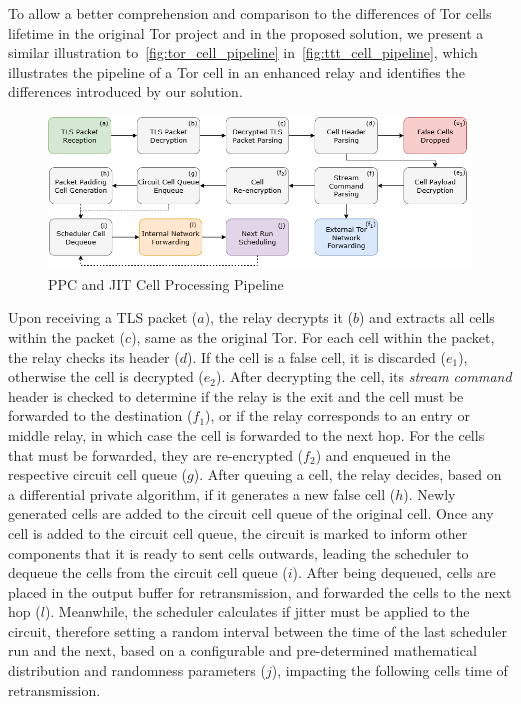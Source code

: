 To allow a better comprehension and comparison to the differences of Tor cells lifetime in the original Tor project and in the proposed solution, we present a similar illustration to~\autoref{fig:tor_cell_pipeline} in~\autoref{fig:ttt_cell_pipeline}, which illustrates the pipeline of a Tor cell in an enhanced relay and identifies the differences introduced by our solution.
\begin{figure}[!h]
  \centering
  \includegraphics[width=\textwidth]{Chapters/Figures/Solution_Cell_Pipeline.png}
  \caption{PPC and JIT Cell Processing Pipeline}\label{fig:ttt_cell_pipeline}
\end{figure}

Upon receiving a TLS packet (\(a\)), the relay decrypts it (\(b\)) and extracts all cells within the packet (\(c\)), same as the original Tor. For each cell within the packet, the relay checks its header (\(d\)). If the cell is a false cell, it is discarded (\(e_1\)), otherwise the cell is decrypted (\(e_2\)). After decrypting the cell, its \textit{stream command} header is checked to determine if the relay is the exit and the cell must be forwarded to the destination (\(f_1\)), or if the relay corresponds to an entry or middle relay, in which case the cell is forwarded to the next hop. For the cells that must be forwarded, they are re-encrypted (\(f_2\)) and enqueued in the respective circuit cell queue (\(g\)). After queuing a cell, the relay decides, based on a differential private algorithm, if it generates a new false cell (\(h\)). Newly generated cells are added to the circuit cell queue of the original cell. Once any cell is added to the circuit cell queue, the circuit is marked to inform other components that it is ready to sent cells outwards, leading the scheduler to dequeue the cells from the circuit cell queue (\(i\)). After being dequeued, cells are placed in the output buffer for retransmission, and forwarded the cells to the next hop (\(l\)). Meanwhile, the scheduler calculates if jitter must be applied to the circuit, therefore setting a random interval between the time of the last scheduler run and the next, based on a configurable and pre-determined mathematical distribution and randomness parameters (\(j\)), impacting the following cells time of retransmission. 

